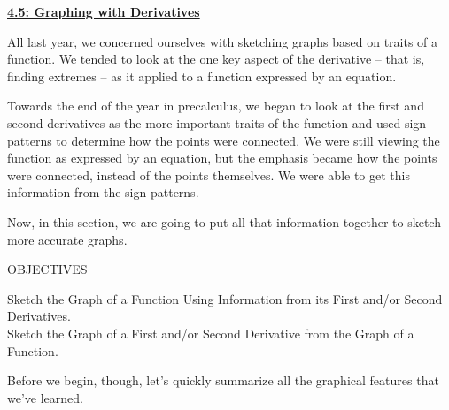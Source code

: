\textbf{\underline{\large{4.5: Graphing with Derivatives}}} \par

All last year, we concerned ourselves with sketching graphs based on traits of a function. We tended to look at the one key aspect of the derivative -- that is, finding extremes -- as it applied to a function expressed by an equation. \par 

Towards the end of the year in precalculus, we began to look at the first and second derivatives as the more important traits of the function and used sign patterns to determine how the points were connected. We were still viewing the function as expressed by an equation, but the emphasis became how the points were connected, instead of the points themselves. We were able to get this information from the sign patterns. \par 

Now, in this section, we are going to put all that information together to sketch more accurate graphs. \par 

\begin{tcolorbox}[objective]
    \begin{center}
        OBJECTIVES \\[11pt]
    \end{center}
    Sketch the Graph of a Function Using Information from its First and/or Second Derivatives. \\
    Sketch the Graph of a First and/or Second Derivative from the Graph of a Function.
\end{tcolorbox}

Before we begin, though, let's quickly summarize all the graphical features that we've learned. \par 

\begin{center}
\end{center}

